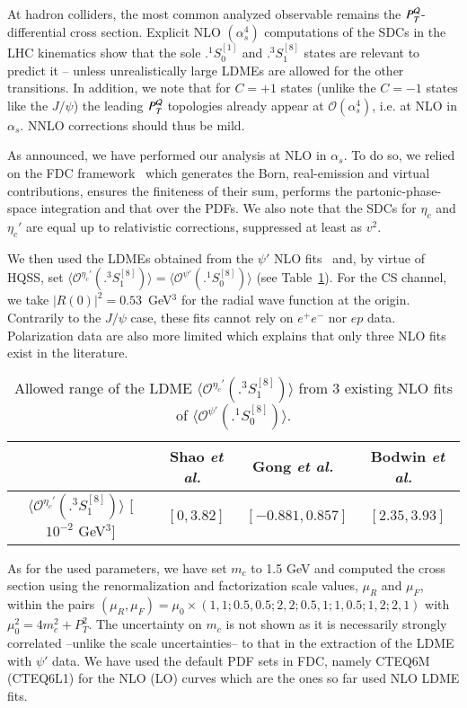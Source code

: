 \documentclass[showpacs,aps,PRL,twocolumn,footinbib,11]{revtex4-1}
\def\etal{{\it et al.}}
\def\oSzo{{\bigl.^1\!S^{[1]}_0}}
\def\tSoe{{\bigl.^3\!S^{[8]}_1}}
\def\psip{\psi'}
\def\etac{\eta_c}
\def\etacp{\eta_c'}
\def\copsip{{\langle\mathcal{O}^{\psip}(\bigl.^1\! S_0^{[8]})\rangle}}
\def\coetacp{{\langle\mathcal{O}^{\etacp}(\bigl.^3\! S_1^{[8]})\rangle}}
\newcommand{\ct}[1]{{Table~\ref{#1}}}
\begin{document}
At hadron colliders, the most common analyzed observable remains the $P^{\cal Q}_T$-differential cross section. 
Explicit NLO $(\alpha_s^4)$ computations of the SDCs in the LHC kinematics show that the sole $\oSzo$ and $\tSoe$ states 
are relevant to predict it -- unless unrealistically large LDMEs are allowed for the other transitions. In addition, we note that for $C=+1$ states (unlike the $C=-1$ states like the $J/\psi$) 
the leading $P^{\cal Q}_T$ topologies already appear at $\mathcal{O}(\alpha_s^4)$, i.e. at NLO in $\alpha_s$.
NNLO corrections should thus be mild.  
  
As announced, we have performed our analysis at NLO in $\alpha_s$. To do so, we relied 
on the FDC framework~\cite{Wang:2004du,Gong:2014qya} which generates the Born, real-emission
and virtual contributions, ensures the finiteness of their sum, performs the partonic-phase-space integration and that
over the PDFs. We also note that the SDCs for $\etac$ and $\etacp$ are 
equal up to relativistic corrections, suppressed at least as $v^2$.

We then used the LDMEs obtained from the $\psip$ NLO 
fits~\cite{Shao:2014yta,Gong:2012ug,Bodwin:2015iua} and, by virtue of HQSS,
set $\coetacp=\copsip$ (see \ct{tab:LDME}). For the CS channel, we take $|R(0)|^2=0.53$~GeV$^3$ for
the radial wave function at the origin.
Contrarily to the $J/\psi$ case, these fits cannot rely on $e^+e^-$ nor $ep$ data. Polarization
data are also more limited which explains that only three NLO fits exist in the literature.

\begin{table}[hbt!]
\begin{footnotesize}
\hspace{-0.5cm}
\begin{tabular}{c|c|c|c}
\hline
\rule{0pt}{3ex}
& Shao \etal~\cite{Shao:2014yta} & 
 Gong \etal~\cite{Gong:2012ug} & Bodwin \etal~\cite{Bodwin:2015iua}\\[1mm] 
\hline
\parbox{2.cm}{$\coetacp$ [$10^{-2}$ GeV$^3$]}& $[0,3.82]$  
  & $[-0.881,0.857]$ 
  & $[2.35,3.93]$\\   
\hline
\end{tabular}
\caption{Allowed range of the LDME $\coetacp$ from 
3 existing NLO fits of $\copsip$.}
\label{tab:LDME} 
\end{footnotesize}
\end{table}

As for the used parameters, we have set $m_c$ to 1.5 GeV and computed the cross
section using the renormalization and factorization scale values, $\mu_R$ and $\mu_F$,
within the pairs
$(\mu_R,\mu_F)=\mu_0 \times (1,1;0.5,0.5;2,2;0.5,1;1,0.5;1,2;2,1)$ with $\mu_0^2=4m^2_c+P_T^2$.
The uncertainty on $m_c$ is not shown as it is necessarily strongly correlated --unlike the scale uncertainties-- to that in the extraction of the LDME with $\psip$ data. We have used the default PDF sets in FDC, namely CTEQ6M (CTEQ6L1) for the NLO (LO) curves which are the ones so far used NLO LDME fits.
\end{document}
